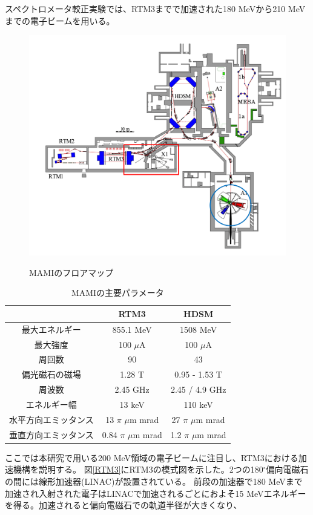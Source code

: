 \documentclass[a4paper,11pt,uplatex]{jsbook}
\begin{document}
スペクトロメータ較正実験では、RTM3までで加速された180 MeVから210 MeVまでの電子ビームを用いる。
\begin{figure}[b]
  \centering
  \includegraphics[width=0.8\linewidth]{image/3-MAMI.png}\\
  \caption{MAMIのフロアマップ}
  \label{fig:MAMI}
\end{figure}
\begin{table}
  \caption{MAMIの主要パラメータ}\label{MAMI}
  \centering
  \begin{tabular}{c||cc}
    \hline
     &RTM3 & HDSM \\
    \hline
    最大エネルギー & 855.1 MeV & 1508 MeV \\
    最大強度 & 100 $\mu$A & 100 $\mu$A \\
    周回数 & 90 & 43 \\
    偏光磁石の磁場 &1.28 T & 0.95 - 1.53 T\\
    周波数 & 2.45 GHz & 2.45 / 4.9 GHz \\
    エネルギー幅 & 13 keV & 110 keV \\
    水平方向エミッタンス & 13 $\pi$ $\mu$m mrad & 27 $\pi$ $\mu$m mrad \\
    垂直方向エミッタンス & 0.84 $\pi$ $\mu$m mrad & 1.2 $\pi$ $\mu$m mrad\\
    \hline
  \end{tabular}
\end{table}
ここでは本研究で用いる200 MeV領域の電子ビームに注目し、RTM3における加速機構を説明する。
図\ref{RTM3}にRTM3の模式図を示した。2つの180$^\circ$偏向電磁石の間には線形加速器(LINAC)が設置されている。
前段の加速器で180 MeVまで加速され入射された電子はLINACで加速されるごとにおよそ15 MeVエネルギーを得る。加速されると偏向電磁石での軌道半径が大きくなり、
\end{document}
